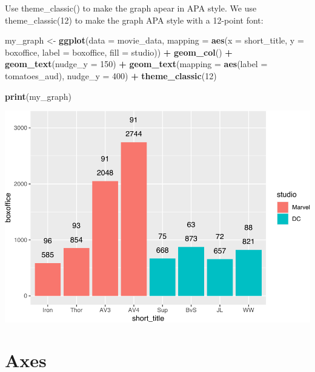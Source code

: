 \documentclass[
]{krantz}
\makeatletter
\newenvironment{Shaded}{\begin{snugshade}}{\end{snugshade}}
\newcommand{\DataTypeTok}[1]{\textcolor[rgb]{0.27,0.27,0.27}{#1}}
\newcommand{\DecValTok}[1]{\textcolor[rgb]{0.06,0.06,0.06}{#1}}
\newcommand{\KeywordTok}[1]{\textcolor[rgb]{0.27,0.27,0.27}{\textbf{#1}}}
\newcommand{\NormalTok}[1]{#1}
\newcommand{\OperatorTok}[1]{\textcolor[rgb]{0.43,0.43,0.43}{\textbf{#1}}}
\newcommand{\StringTok}[1]{\textcolor[rgb]{0.5,0.5,0.5}{#1}}
\newenvironment{kframe}{%
\medskip{}
\setlength{\fboxsep}{.8em}
 \def\at@end@of@kframe{}%
 \ifinner\ifhmode%
  \def\at@end@of@kframe{\end{minipage}}%
  \begin{minipage}{\columnwidth}%
 \fi\fi%
 \def\FrameCommand##1{\hskip\@totalleftmargin \hskip-\fboxsep
 \colorbox{shadecolor}{##1}\hskip-\fboxsep
     \hskip-\linewidth \hskip-\@totalleftmargin \hskip\columnwidth}%
 \MakeFramed {\advance\hsize-\width
   \@totalleftmargin\z@ \linewidth\hsize
   \@setminipage}}%
 {\par\unskip\endMakeFramed%
 \at@end@of@kframe}
\renewenvironment{Shaded}{\begin{kframe}}{\end{kframe}}
\makeatother
\begin{document}
Use theme\_classic() to make the graph apear in APA style. We use theme\_classic(12) to make the graph APA style with a 12-point font:

\begin{Shaded}
\begin{Highlighting}[]
\NormalTok{my_graph <-}\StringTok{ }\KeywordTok{ggplot}\NormalTok{(}\DataTypeTok{data =}\NormalTok{ movie_data,}
           \DataTypeTok{mapping =} \KeywordTok{aes}\NormalTok{(}\DataTypeTok{x =}\NormalTok{ short_title,}
                         \DataTypeTok{y =}\NormalTok{ boxoffice,}
                         \DataTypeTok{label =}\NormalTok{ boxoffice, }
                         \DataTypeTok{fill =}\NormalTok{ studio)) }\OperatorTok{+}
\StringTok{  }\KeywordTok{geom_col}\NormalTok{() }\OperatorTok{+}
\StringTok{  }\KeywordTok{geom_text}\NormalTok{(}\DataTypeTok{nudge_y =} \DecValTok{150}\NormalTok{)  }\OperatorTok{+}
\StringTok{  }\KeywordTok{geom_text}\NormalTok{(}\DataTypeTok{mapping =} \KeywordTok{aes}\NormalTok{(}\DataTypeTok{label =}\NormalTok{ tomatoes_aud), }
            \DataTypeTok{nudge_y =} \DecValTok{400}\NormalTok{) }\OperatorTok{+}
\StringTok{  }\KeywordTok{theme_classic}\NormalTok{(}\DecValTok{12}\NormalTok{)}

\KeywordTok{print}\NormalTok{(my_graph)}
\end{Highlighting}
\end{Shaded}

\includegraphics{bookdown_files/figure-latex/unnamed-chunk-246-1.pdf}

\hypertarget{axes}{%
\section{Axes}\label{axes}}
\end{document}
